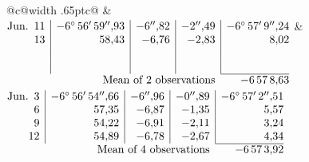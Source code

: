 \noindent\begin{tabular}{@{}c@{\hspace{.4em}\vrule width .65pt\hspace{.4em}}c@{}}
 &
 \\[.18ex]
\(\begin{array}[t]{@{}r|r|r|r|r@{}}
\text{Jun.}\enspace 11 & -6^\circ\,56'\,59''{,}93 & -6''{,}82 & -2''{,}49 & -6^\circ\,57'\,9''{,}24\\
13 & 58{,}43 & -6{,}76 & -2{,}83 & 8{,}02\\
 & & & & \\
 & & & & \\
\cline{5-5}
\multicolumn{4}{r}{\text{Mean of 2 observations}} & -6\,57\,8{,}63
\end{array}\)
&
\(\begin{array}[t]{@{}r|r|r|r|r@{}}
\text{Jun.}\enspace 3 & -6^\circ\,56'\,54''{,}66 & -6''{,}96 & -0''{,}89 & -6^\circ\,57'\,2''{,}51\\
6 & 57{,}35 & -6{,}87 & -1{,}35 & 5{,}57\\
9 & 54{,}22 & -6{,}91 & -2{,}11 & 3{,}24\\
12 & 54{,}89 & -6{,}78 & -2{,}67 & 4{,}34\\
\cline{5-5}
\multicolumn{4}{r}{\text{Mean of 4 observations}} & -6\,57\,3{,}92
\end{array}\)
\end{tabular}\par\medskip
{}
